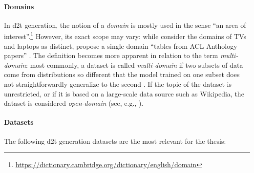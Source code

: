 {\paragraph{Domains} In \ac{d2t} generation, the notion of a \emph{domain} is mostly used in the sense ``an area of interest''.\footnote{\url{https://dictionary.cambridge.org/dictionary/english/domain}} However, its exact scope may vary: while \citet{wen2016multi} consider the domains of TVs and laptops as distinct, \citet{lin2023survey} propose a single domain ``tables from ACL Anthology papers'' \cite{suadaaTabletoTextGenerationNumerical2021}. The definition becomes more apparent in relation to the term \emph{multi-domain}: most commonly, a dataset is called \emph{multi-domain} if two subsets of data come from distributions so different that the model trained on one subset does not straightforwardly generalize to the second \cite{vanderleeCACAPODatasetMultilingual2020,budzianowskiMultiWOZLargeScaleMultiDomain2020,rastogiScalableMultiDomainConversational2020}. If the topic of the dataset is unrestricted, or if it is based on a large-scale data source such as Wikipedia, the dataset is considered \emph{open-domain} (see, e.g., \citealp{chenLogicalNaturalLanguage2020,nan2021dart,kann2022open}).

\paragraph{Datasets} The following \ac{d2t} generation datasets are the most relevant for the thesis:

}
